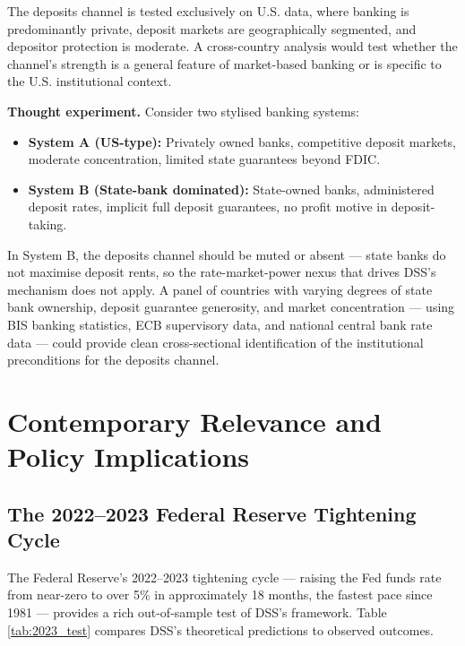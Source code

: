 \documentclass[12pt,a4paper]{article}
\begin{document}
\begin{extbox}
The deposits channel is tested exclusively on U.S. data, where banking is
predominantly private, deposit markets are geographically segmented, and
depositor protection is moderate. A cross-country analysis would test whether
the channel's strength is a general feature of market-based banking or is
specific to the U.S. institutional context.

\textbf{Thought experiment.} Consider two stylised banking systems:
\begin{itemize}
  \item \textbf{System A (US-type):} Privately owned banks, competitive deposit
    markets, moderate concentration, limited state guarantees beyond FDIC.
  \item \textbf{System B (State-bank dominated):} State-owned banks, administered
    deposit rates, implicit full deposit guarantees, no profit motive in
    deposit-taking.
\end{itemize}
In System B, the deposits channel should be muted or absent --- state banks do
not maximise deposit rents, so the rate-market-power nexus that drives DSS's
mechanism does not apply. A panel of countries with varying degrees of state
bank ownership, deposit guarantee generosity, and market concentration ---
using BIS banking statistics, ECB supervisory data, and national central bank
rate data --- could provide clean cross-sectional identification of the
institutional preconditions for the deposits channel.
\end{extbox}

\section{Contemporary Relevance and Policy Implications}
\label{sec:contemporary}

\subsection{The 2022--2023 Federal Reserve Tightening Cycle}

The Federal Reserve's 2022--2023 tightening cycle --- raising the Fed funds
rate from near-zero to over 5\% in approximately 18 months, the fastest pace
since 1981 --- provides a rich out-of-sample test of DSS's framework. Table
\ref{tab:2023_test} compares DSS's theoretical predictions to observed
outcomes.
\end{document}
